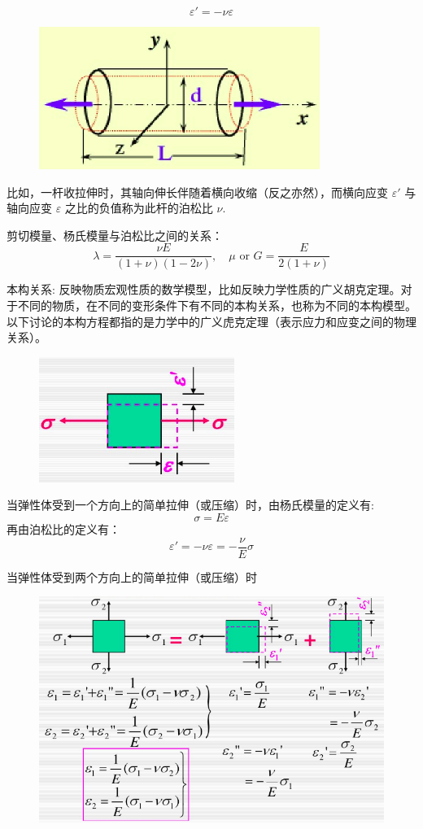 \documentclass[12pt,a4paper]{article}
\begin{document}
$$
\varepsilon '=-\nu\varepsilon
$$

\begin{figure}[H]
\centering
\includegraphics[scale=0.4]{./figures/20.png}
\caption{}
\end{figure}

比如，一杆收拉伸时，其轴向伸长伴随着横向收缩（反之亦然），而横向应变 $\varepsilon '$ 与轴向应变 $\varepsilon$ 之比的负值称为此杆的泊松比 $\nu$.

剪切模量、杨氏模量与泊松比之间的关系：
$$
\lambda = \frac{\nu E}{(1 + \nu)(1 - 2\nu)},\quad \mu \text{ or } G= \frac{E}{2(1 + \nu)}
$$

本构关系: 反映物质宏观性质的数学模型，比如反映力学性质的广义胡克定理。对于不同的物质，在不同的变形条件下有不同的本构关系，也称为不同的本构模型。以下讨论的本构方程都指的是力学中的广义虎克定理（表示应力和应变之间的物理关系）。

\begin{figure}[H]
\centering
\includegraphics[scale=0.5]{./figures/21.png}
\caption{}
\end{figure}

当弹性体受到一个方向上的简单拉伸（或压缩）时，由杨氏模量的定义有:
$$
\sigma=E\varepsilon
$$
再由泊松比的定义有：
$$
\varepsilon '=-\nu\varepsilon=-\frac{\nu}{E}\sigma
$$

当弹性体受到两个方向上的简单拉伸（或压缩）时

\begin{figure}[H]
\centering
\includegraphics[scale=0.5]{./figures/22.png}
\caption{}
\end{figure}
\end{document}
